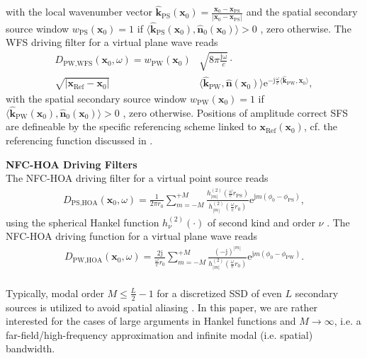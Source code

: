 \documentclass[a4paper, 10pt, twocolumn]{article}
\def\NewL{\\\noindent\hspace*{3mm}}
\begin{document}
with the local wavenumber vector \cite{FirthaIEEE2017,FirthaIEEE2018} $\mathbf{\hat{k}}_\text{PS}(\mathbf{x}_0) = \frac{\mathbf{x}_0-\mathbf{x}_\text{PS}}{|\mathbf{x}_0-\mathbf{x}_\text{PS}|}$
and the spatial secondary source window
$w_\text{PS}(\mathbf{x}_0) = 1$ if $\langle \mathbf{\hat{k}}_\text{PS}(\mathbf{x}_0),\mathbf{\hat{n}}_0(\mathbf{x}_0)\rangle>0$
, zero otherwise.
%
The WFS driving filter for a virtual plane wave reads \cite[(2.177)]{SchultzDiss2016}
\begin{align}
\label{eq:plane_wave_WFS}
D_{\text{PW,WFS}}(\mathbf{x}_0,\omega) =
w_\text{PW}(\mathbf{x}_0) & \sqrt{8 \pi \frac{\mathrm{j \omega}}{c}}\cdot\\
\sqrt{|\mathbf{x}_\text{Ref}-\mathbf{x}_{0}|}
&\langle \mathbf{\hat{k}}_\text{PW} , \mathbf{\hat{n}}(\mathbf{x}_0) \rangle
\mathrm{e}^{- \mathrm{j} \frac{\omega}{\mathrm{c}}\langle \mathbf{\hat{k}}_\text{PW} , \mathbf{x}_0 \rangle},\nonumber
\end{align}
with the spatial secondary source window
$w_\text{PW}(\mathbf{x}_0) = 1$ if $\langle \mathbf{\hat{k}}_\text{PW} (\mathbf{x}_0),\mathbf{\hat{n}}_0(\mathbf{x}_0)\rangle>0$
, zero otherwise.
Positions of amplitude correct SFS are defineable by the specific referencing scheme linked to 
$\mathbf{x}_\text{Ref}(\mathbf{x}_0)$, cf. the referencing function discussed in 
\cite{FirthaIEEE2017}.
%
%
%
%

\textbf{NFC-HOA Driving Filters}
%
\NewL The NFC-HOA driving filter for a virtual point source reads \cite[Ch. 5]{AhrensBook}
\begin{align}
D_{\text{PS,HOA}}(\mathbf{x}_0,\omega) = \frac{1}{2 \pi r_0} \sum\limits_{m=-M}^{+M} \frac{h^{(2)}_{|m|}(\frac{\omega}{\mathrm{c}} r_\text{PS})}{h^{(2)}_{|m|}(\frac{\omega}{\mathrm{c}} r_0)} \mathrm{e}^{\mathrm{j} m (\phi_0 - \phi_\text{PS})},
\end{align}
using the spherical Hankel function $h_\nu^{(2)}(\cdot)$ of second kind and order $\nu$ \cite[Ch. 10]{NIST}.
%
The NFC-HOA driving function for a virtual plane wave reads \cite[Ch. 5]{AhrensBook}
\begin{align}
\label{eq:plane_wave_HOA}
D_{\text{PW,HOA}}(\mathbf{x}_0,\omega) = \frac{2 \mathrm{j}}{\frac{\omega}{\mathrm{c}} r_0} \sum\limits_{m=-M}^{+M} \frac{(-\mathrm{j})^{|m|}}{h_{|m|}^{(2)}(\frac{\omega}{\mathrm{c}} r_0)} \mathrm{e}^{\mathrm{j} m (\phi_0 - \phi_\text{PW})}.
\end{align}
%
%
%
\NewL Typically, modal order $M\leq \frac{L}{2}-1$ for a discretized SSD of even $L$ 
secondary sources is utilized to avoid spatial aliasing \cite[Sec. 4.4.1]{AhrensBook}.
%
In this paper, we are rather interested for the cases of large arguments in Hankel functions
and $M\rightarrow \infty$, i.e. a far-field/high-frequency approximation and 
infinite modal (i.e. spatial) bandwidth.
%
%
%
\end{document}
